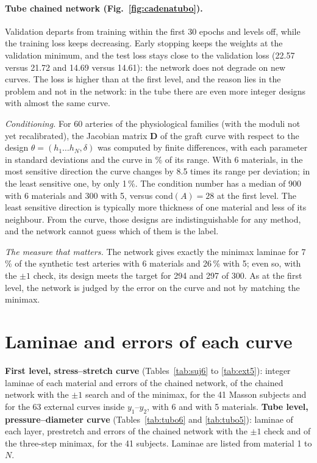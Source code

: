 \paragraph{Tube chained network (Fig.~\ref{fig:cadenatubo}).} Validation departs from training within the first 30 epochs and levels off, while the training loss keeps decreasing. Early stopping keeps the weights at the validation minimum, and the test loss stays close to the validation loss (22.57 versus 21.72 and 14.69 versus 14.61): the network does not degrade on new curves. The loss is higher than at the first level, and the reason lies in the problem and not in the network: in the tube there are even more integer designs with almost the same curve.

\emph{Conditioning.} For 60 arteries of the physiological families (with the moduli not yet recalibrated), the Jacobian matrix $\mathbf{D}$ of the graft curve with respect to the design $\theta=(h_1\ldots h_N,\delta)$ was computed by finite differences, with each parameter in standard deviations and the curve in \% of its range. With 6 materials, in the most sensitive direction the curve changes by 8.5 times its range per deviation; in the least sensitive one, by only 1\,\%. The condition number has a median of 900 with 6 materials and 300 with 5, versus $\mathrm{cond}(A)=28$ at the first level. The least sensitive direction is typically more thickness of one material and less of its neighbour. From the curve, those designs are indistinguishable for any method, and the network cannot guess which of them is the label.

\emph{The measure that matters.} The network gives exactly the minimax laminae for 7\,\% of the synthetic test arteries with 6 materials and 26\,\% with 5; even so, with the $\pm1$ check, its design meets the target for 294 and 297 of 300. As at the first level, the network is judged by the error on the curve and not by matching the minimax.

\clearpage
\section{Laminae and errors of each curve}\label{sec:tablas}
\textbf{First level, stress--stretch curve} (Tables~\ref{tab:suj6} to \ref{tab:ext5}): integer laminae of each material and errors of the chained network, of the chained network with the $\pm1$ search and of the minimax, for the 41 Masson subjects and for the 63 external curves inside $y_1$--$y_2$, with 6 and with 5 materials. \textbf{Tube level, pressure--diameter curve} (Tables~\ref{tab:tubo6} and \ref{tab:tubo5}): laminae of each layer, prestretch and errors of the chained network with the $\pm1$ check and of the three-step minimax, for the 41 subjects. Laminae are listed from material 1 to $N$.







